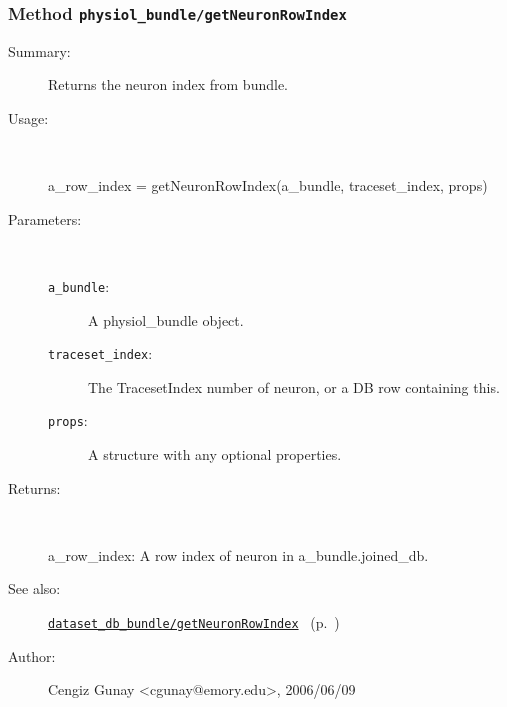 \subsubsection[Method \texttt{getNeuronRowIndex}]{Method \texttt{physiol\_bundle/getNeuronRowIndex}}%
%
\label{ref_physiol_bundle__getNeuronRowIndex}%
\hypertarget{ref_physiol_bundle__getNeuronRowIndex}{}%
\begin{description}
\item[Summary:]Returns the neuron index from bundle.
%
\item[Usage:]~%
\begin{lyxcode}%
a\_row\_index = getNeuronRowIndex(a\_bundle, traceset\_index, props)
%
\end{lyxcode}%
%
%
\item[Parameters:]~
\begin{description}%
\item[\texttt{a\_bundle}:]
 A physiol\_bundle object.
\item[\texttt{traceset\_index}:]
 The TracesetIndex number of neuron, or a DB row containing this.
\item[\texttt{props}:]
 A structure with any optional properties.
\end{description}%
%
\item[Returns:
]~

	a\_row\_index: A row index of neuron in a\_bundle.joined\_db.
%
%
\item[See also:]%
\hyperlink{ref_dataset_db_bundle__getNeuronRowIndex}{\texttt{dataset\_db\_bundle/getNeuronRowIndex}}%
\ (p.~\pageref{ref_dataset_db_bundle__getNeuronRowIndex})%
%
%
\item[Author:]%
Cengiz Gunay <cgunay@emory.edu>, 2006/06/09
%
\end{description}
\methodline%
